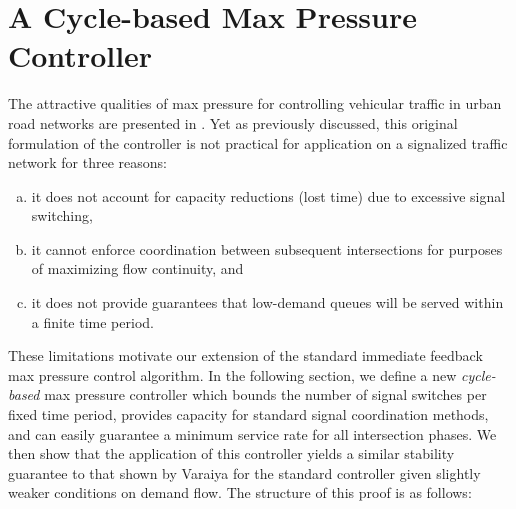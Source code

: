 \section{A Cycle-based Max Pressure Controller} 




 



The attractive qualities of max pressure for controlling vehicular traffic in urban road networks are presented in \cite{MaxPressureStochastic}. Yet as previously discussed, this original formulation of the controller is not practical for application on a signalized traffic network for three reasons:
\begin{enumerate}[a)]
\item it does not account for capacity reductions (lost time) due to excessive signal switching, 
\item it cannot enforce coordination between subsequent intersections for purposes of maximizing flow continuity, and
\item it does not provide guarantees that low-demand queues will be served within a finite time period. 
\end{enumerate} 
These limitations motivate our extension of the standard immediate feedback max pressure control algorithm. In the following section, we define a new \emph{cycle-based} max pressure controller which bounds the number of signal switches per fixed time period, provides capacity for standard signal coordination methods, and can easily guarantee a minimum service rate for all intersection phases. We then show that the application of this controller yields a similar stability guarantee to that shown by Varaiya for the standard controller given slightly weaker conditions on demand flow. The structure of this proof is as follows: 
